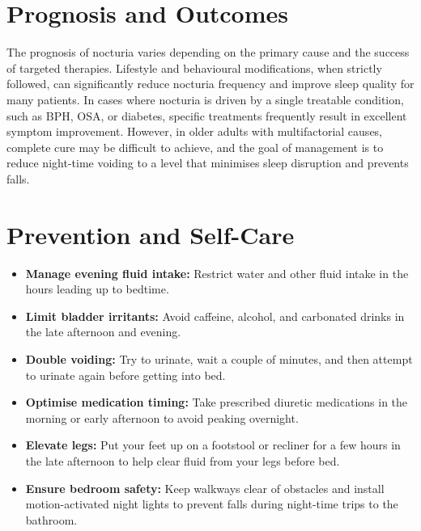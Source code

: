 \section*{Prognosis and Outcomes}
The prognosis of nocturia varies depending on the primary cause and the success of targeted therapies. Lifestyle and behavioural modifications, when strictly followed, can significantly reduce nocturia frequency and improve sleep quality for many patients. In cases where nocturia is driven by a single treatable condition, such as BPH, OSA, or diabetes, specific treatments frequently result in excellent symptom improvement. However, in older adults with multifactorial causes, complete cure may be difficult to achieve, and the goal of management is to reduce night-time voiding to a level that minimises sleep disruption and prevents falls.

\section*{Prevention and Self-Care}
\begin{itemize}
    \item \textbf{Manage evening fluid intake:} Restrict water and other fluid intake in the hours leading up to bedtime.
    \item \textbf{Limit bladder irritants:} Avoid caffeine, alcohol, and carbonated drinks in the late afternoon and evening.
    \item \textbf{Double voiding:} Try to urinate, wait a couple of minutes, and then attempt to urinate again before getting into bed.
    \item \textbf{Optimise medication timing:} Take prescribed diuretic medications in the morning or early afternoon to avoid peaking overnight.
    \item \textbf{Elevate legs:} Put your feet up on a footstool or recliner for a few hours in the late afternoon to help clear fluid from your legs before bed.
    \item \textbf{Ensure bedroom safety:} Keep walkways clear of obstacles and install motion-activated night lights to prevent falls during night-time trips to the bathroom.
\end{itemize}

